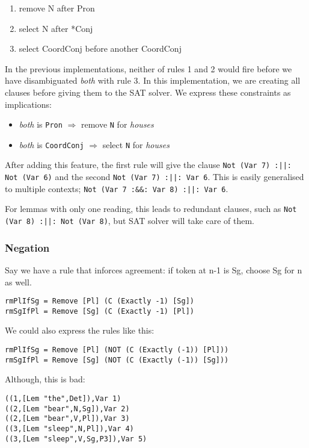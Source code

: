 \documentclass[a4paper, 11pt]{article}
\begin{document}
\begin{enumerate}
\item remove N after Pron
\item select N after *Conj
\item select CoordConj before another CoordConj
\end{enumerate}

In the previous implementations, neither of rules 1 and 2 would fire
before we have disambiguated \emph{both} with rule 3.
In this implementation, we are creating all clauses before giving
them to the SAT solver. We express these constraints as implications:
\begin{itemize}
\item \emph{both} is \texttt{Pron} $\Rightarrow$ remove \texttt{N} for \emph{houses}
\item \emph{both} is \texttt{CoordConj} $\Rightarrow$ select
  \texttt{N} for \emph{houses}
\end{itemize}

After adding this feature, the first rule will give the clause
\texttt{Not (Var 7) :||: Not (Var 6)} and the second \texttt{Not (Var
  7) :||: Var 6}.
This is easily generalised to multiple contexts; \texttt{Not (Var
  7 :&&: Var 8) :||: Var 6}.

For lemmas with only one reading, this leads to redundant clauses,
such as \texttt{Not (Var 8) :||: Not (Var 8)}, but SAT solver will
take care of them.

\subsubsection{Negation}

Say we have a rule that inforces agreement: if token at n-1 is Sg,
choose Sg for n as well.

\begin{lstlisting}
rmPlIfSg = Remove [Pl] (C (Exactly -1) [Sg])
rmSgIfPl = Remove [Sg] (C (Exactly -1) [Pl])
\end{lstlisting}

We could also express the rules like this:
\begin{lstlisting}
rmPlIfSg = Remove [Pl] (NOT (C (Exactly (-1)) [Pl]))
rmSgIfPl = Remove [Sg] (NOT (C (Exactly (-1)) [Sg]))
\end{lstlisting}

Although, this is bad: 
\begin{lstlisting}
((1,[Lem "the",Det]),Var 1)
((2,[Lem "bear",N,Sg]),Var 2)
((2,[Lem "bear",V,Pl]),Var 3)
((3,[Lem "sleep",N,Pl]),Var 4)
((3,[Lem "sleep",V,Sg,P3]),Var 5)
\end{lstlisting}
\end{document}
